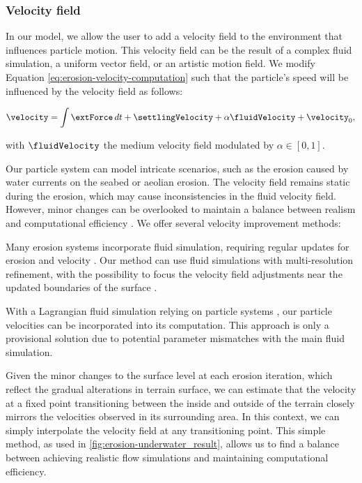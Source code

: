 \subsubsection{Velocity field}
\label{sec:erosion-velocity_field_refinement}

In our model, we allow the user to add a velocity field to the environment that influences particle motion. This velocity field can be the result of a complex fluid simulation, a uniform vector field, or an artistic motion field.
We modify Equation \eqref{eq:erosion-velocity-computation} such that the particle's speed will be influenced by the velocity field as follows:

\begin{align}
    \label{eq:erosion-velocity-computation-final}
    \velocity = \int{ \extForce \, dt} + \settlingVelocity + \alpha \fluidVelocity + \velocity_0,
\end{align}

with $\fluidVelocity$ the medium velocity field modulated by $\alpha \in [0,1]$. 

Our particle system can model intricate scenarios, such as the erosion caused by water currents on the seabed or aeolian erosion. The velocity field remains static during the erosion, which may cause inconsistencies in the fluid velocity field. However, minor changes can be overlooked to maintain a balance between realism and computational efficiency \cite{Tychonievich2010}. We offer several velocity improvement methods: 
\begin{Itemize}
     Many erosion systems incorporate fluid simulation, requiring regular updates for erosion and velocity \cite{Kristof2009, Wojtan2007}. Our method can use fluid simulations with multi-resolution refinement, with the possibility to focus the velocity field adjustments near the updated boundaries of the surface \cite{Roose2011}. 
    
     With a Lagrangian fluid simulation relying on particle systems \cite{Koschier2022}, our particle velocities can be incorporated into its computation. This approach is only a provisional solution due to potential parameter mismatches with the main fluid simulation. 

     Given the minor changes to the surface level at each erosion iteration, which reflect the gradual alterations in terrain surface, we can estimate that the velocity at a fixed point transitioning between the inside and outside of the terrain closely mirrors the velocities observed in its surrounding area. In this context, we can simply interpolate the velocity field at any transitioning point. This simple method, as used in \cref{fig:erosion-underwater_result}, allows us to find a balance between achieving realistic flow simulations and maintaining computational efficiency.
\end{Itemize}


